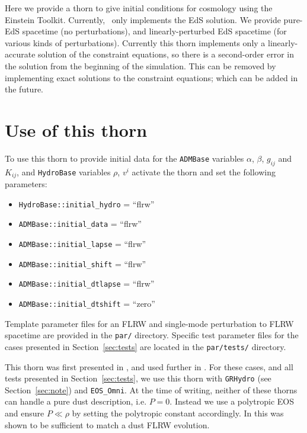 Here we provide a thorn to give initial conditions for cosmology using the Einstein Toolkit. Currently, \flrwsolver\ only implements the EdS solution. We provide pure-EdS spacetime (no perturbations), and linearly-perturbed EdS spacetime (for various kinds of perturbations). Currently this thorn implements only a linearly-accurate solution of the constraint equations, so there is a second-order error in the solution from the beginning of the simulation. This can be removed by implementing exact solutions to the constraint equations; which can be added in the future. 


\section{Use of this thorn}
\label{sec:use}

To use this thorn to provide initial data for the {\tt ADMBase} variables $\alpha$, $\beta$, $g_{ij}$ and $K_{ij}$, and {\tt HydroBase} variables $\rho$, $v^i$ activate the thorn and set the following parameters: 
\begin{itemize}
	\item \texttt{HydroBase::initial\_hydro} = ``flrw''
	\item \texttt{ADMBase::initial\_data} = ``flrw''
	\item \texttt{ADMBase::initial\_lapse} = ``flrw''
	\item \texttt{ADMBase::initial\_shift} = ``flrw''
	\item \texttt{ADMBase::initial\_dtlapse} = ``flrw''
	\item \texttt{ADMBase::initial\_dtshift} = ``zero''
\end{itemize}

Template parameter files for an FLRW and single-mode perturbation to FLRW spacetime are provided in the {\tt par/} directory. Specific test parameter files for the cases presented in Section~\ref{sec:tests} are located in the {\tt par/tests/} directory. 

This thorn was first presented in \cite{macpherson2017}, and used further in \cite{macpherson2019}. For these cases, and all tests presented in Section~\ref{sec:tests}, we use this thorn with {\tt GRHydro} (see Section~\ref{sec:note}) and {\tt EOS\_Omni}. At the time of writing, neither of these thorns can handle a pure dust description, i.e. $P=0$. Instead we use a polytropic EOS and ensure $P\ll\rho$ by setting the polytropic constant accordingly. In \cite{macpherson2017} this was shown to be sufficient to match a dust FLRW evolution. 





